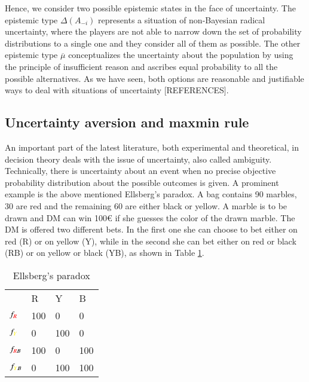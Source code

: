 \documentclass[fleqn,reqno,11pt]{article}
\begin{document}
Hence, we consider two possible epistemic states in the face of uncertainty. The epistemic type $\Delta(A_{-i})$ represents a situation of non-Bayesian radical uncertainty, where the players are not able to narrow down the set of probability distributions to a single one and they consider all of them as possible. The other epistemic type $\overline{\mu}$ conceptualizes the uncertainty about the population by using the principle of insufficient reason and ascribes equal probability to all the possible alternatives. As we have seen, both options are reasonable and justifiable ways to deal with situations of uncertainty [REFERENCES]. \\

\subsection{Uncertainty aversion and maxmin rule}


An important part of the latest literature, both experimental and theoretical, in decision theory deals with the issue of uncertainty, also called ambiguity. Technically, there is uncertainty about an event when no precise objective probability distribution about the possible outcomes is given. A prominent example is the above mentioned Ellsberg's paradox. A bag contains 90 marbles, 30 are red and the remaining 60 are either black or yellow. A marble is to be drawn and DM can win 100€ if she guesses the color of the drawn marble. The DM is offered two different bets. In the first one she can choose to bet either on red (R) or on yellow (Y), while in the second she can bet either on red or black (RB) or on yellow or black (YB), as shown in Table \ref{Ellsberg}.



\begin{table}[h]
\centering
\begin{tabular}{@{}llll@{}}
\cmidrule(l){2-4}
\multicolumn{1}{c}{} & {\color{red}R}   & {\color{yellow}Y}   & B   \\ \cmidrule(l){2-4} 
$f_{{\color{red}R}}$              & 100 & 0   & 0   \\
$f_{{\color{yellow}Y}}$              & 0   & 100 & 0   \\
$f_{{\color{red}R}B}$            & 100 & 0   & 100 \\
$f_{{\color{yellow}Y}B}$             & 0   & 100 & 100 \\ \bottomrule
\end{tabular}
\caption{Ellsberg's paradox}
\label{Ellsberg}
\end{table}
\end{document}
